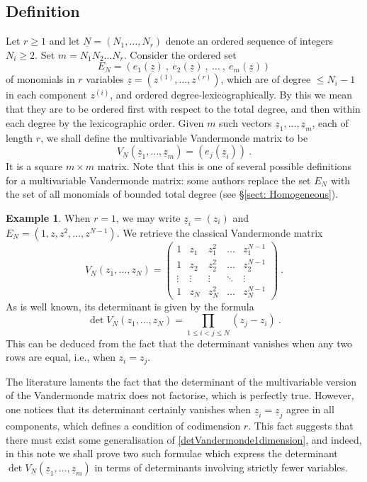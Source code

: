 \documentclass[10pt]{amsart}
\theoremstyle{definition}
\newtheorem{example}[thm]{Example}
\theoremstyle{remark}
\numberwithin{equation}{section}
\newcommand{\z}{\underline{z}}
\newcommand{\0}{\color{blue}{\mathsf{0}}}
\begin{document}
\subsection{Definition}
Let  $r\geq 1$ and let $\underline{N}=(N_1,\ldots, N_r)$ denote an ordered  sequence of integers $N_i \geq 2$. Set $m= N_1N_2 \ldots N_r$.
 Consider the ordered set 
 \[ E_N= ( e_1(\z) \ , \  e_2(\z) \ , \  \ldots  \ , \  e_{m}(\z) ) \]
  of monomials in $r$ variables $\z=(z^{(1)},\ldots, z^{(r)})$, which are of degree $\leq N_i-1$ in each component $z^{(i)}$, and  ordered degree-lexicographically. By this we mean that they are to be ordered first with respect to the total degree, and then within each degree by the lexicographic order.  
  Given $m$ such vectors $\z_1,\ldots, \z_m$, each of length $r$,  we shall define the  multivariable Vandermonde matrix  to be
\begin{equation}  \label{defn: VNmatrix}  V_{\underline{N}} (\z_1,\ldots, \z_m) =  (e_j(\z_i) )\ . \end{equation}
It is a square $m\times m$ matrix.  Note that this is one of several possible definitions for a multivariable Vandermonde matrix: some authors replace the set $E_N$ with the set of all monomials of bounded total degree (see \S\ref{sect: Homogeneous}).

\begin{example}When $r=1$, we may write $\z_i= (z_i)$ and  $E_N= (1, z, z^2, \ldots, z^{N-1})$. We retrieve the classical Vandermonde matrix
\[ V_{\underline{N}}  ( z_1,\ldots, z_N) = \begin{pmatrix} 
1 & z_1 & z_1^2 &   \ldots & z_1^{N-1}  \\
1 & z_2 & z_2^2 &   \ldots & z_2^{N-1}  \\
\vdots  & \vdots&   \vdots &   \ddots &  \vdots \\
1 & z_N & z_N^2 &   \ldots & z_N^{N-1}  
\end{pmatrix} \ . \]
As is  well known, its determinant is given by the formula
\begin{equation}  \label{detVandermonde1dimension} 
\det V_N(z_1,\ldots, z_N) =   \prod_{1\leq i<j\leq N}  (z_j - z_i) \ . 
\end{equation} 
This can be   deduced from the fact that the determinant vanishes when any two rows are equal, i.e., when  $z_i=z_j$. 
\end{example} 
The literature laments the fact that the determinant of the multivariable version of the Vandermonde matrix does not factorise, which is perfectly true. However, one notices that its determinant certainly vanishes when $\z_i=\z_j$ agree in all components, which defines  a condition of codimension $r$.  This fact suggests that there must exist  some generalisation of 
\eqref{detVandermonde1dimension}, and indeed, in this note we shall prove two such formulae which express the determinant $\det V_{\underline{N}}(\z_1,\ldots, \z_m)$ in terms of determinants involving strictly fewer variables.
\end{document}
